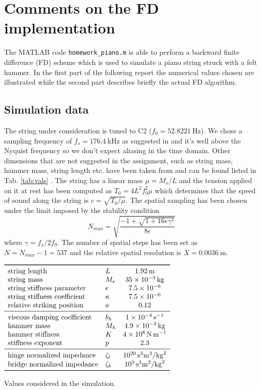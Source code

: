 \documentclass[a4paper]{article}
\begin{document}
\section{Comments on the FD implementation}
The MATLAB code \verb|homework_piano.m| is able to perform a backward finite difference (FD) scheme which is used to simulate a piano string struck with a felt hammer. In the first part of the following report the numerical values chosen are illustrated while the second part describes briefly the actual FD algorithm.

\subsection{Simulation data}
  The string under consideration is tuned to C2 ($f_0 = \SI{52.8221}{\hertz}$). We chose a sampling frequency of $f_s = \SI{176.4}{\kilo\hertz}$ as suggested in \cite{saitis} and it's well above the Nyquist frequency so we don't expect aliasing in the time domain. Other dimensions that are not suggested in the assignment, such as string mass, hammer mass, string length etc. have been taken from \cite{saitis} and can be found listed in Tab. \ref{tab:vals} . The string has a linear mass $\mu = M_s / L$ and the tension applied on it at rest has been computed as $T_0 = 4L^2f_0^2\mu$ which determines that the speed of sound along the string is $c = \sqrt{T_0/\mu}$. The spatial sampling has been chosen under the limit imposed by the stability condition \cite{chaigne} $$ N_{max} = \sqrt{\frac{-1 + \sqrt{1 + 16 \epsilon \gamma ^2}}{8 \epsilon}} $$ where $\gamma = f_s / 2 f_0 $. The number of spatial steps has been set as $N = N_{max} -1 = 537$ and the relative spatial resolution is $X = \SI{0.0036}{\meter}$. 

 \begin{table}[h]
	\centering
	$\begin{array}{llc}
		\toprule
		\text{string length} &	L & \SI{1.92}{\meter}\\
		\text{string mass}   &	M_s & \SI{35e-3}{\kilogram}\\
		\text{string stiffness parameter} &	\epsilon & 7.5 	\times 10^{-6}\\
		\text{string stiffness coefficient} &	\kappa & 7.5 	\times 10^{-6}\\
		\text{relative striking position} &	a & 0.12 \\
		\midrule
		\text{viscous damping coefficient} & b_h & \SI{1e-4}{\second^{-1}}\\
		\text{hammer mass} & M_h & \SI{4.9e-3}{\kilogram} \\
		\text{hammer stiffness} &K & \SI{4e8}{\newton\per\meter}\\
		\text{stiffness exponent} &	p & 2.3 \\
		\midrule
		\text{hinge normalized impedance} &	\zeta_l & \SI{e20}{\second^3\meter^2\per\kilogram^2} \\
		\text{bridge normalized impedance} &	\zeta_b & \SI{e3}{\second^3\meter^2\per\kilogram^2} \\		
		\bottomrule
	\end{array}$
	\caption{Values considered in the simulation.}
	\label{tab:vals}
\end{table}
\end{document}
